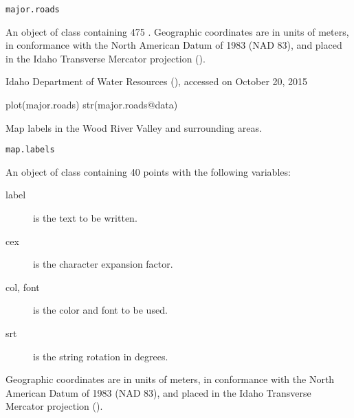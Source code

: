 \documentclass[letterpaper]{book}
\begin{document}
%
\begin{Usage}
\begin{verbatim}
major.roads
\end{verbatim}
\end{Usage}
%
\begin{Format}
An object of  class containing 475 .
Geographic coordinates are in units of meters, in conformance with the North American Datum of 1983 (NAD 83), and placed in the
Idaho Transverse Mercator projection ().
\end{Format}
%
\begin{Source}\relax
Idaho Department of Water Resources (), accessed on October 20, 2015
\end{Source}
%
\begin{Examples}
\begin{ExampleCode}
plot(major.roads)
str(major.roads@data)
\end{ExampleCode}
\end{Examples}
%
\begin{Description}\relax
Map labels in the Wood River Valley and surrounding areas.
\end{Description}
%
\begin{Usage}
\begin{verbatim}
map.labels
\end{verbatim}
\end{Usage}
%
\begin{Format}
An object of  class containing 40 points with the following variables:
\begin{description}

\item[label] is the text to be written.
\item[cex] is the character expansion factor.
\item[col, font] is the color and font to be used.
\item[srt] is the string rotation in degrees.

\end{description}

Geographic coordinates are in units of meters, in conformance with the North American Datum of 1983 (NAD 83), and placed in the
Idaho Transverse Mercator projection ().
\end{Format}
\end{document}
